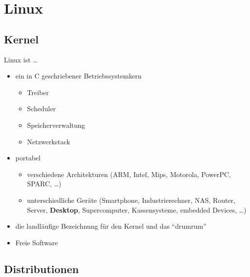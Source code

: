 \documentclass{beamer}
\makeatletter
\newcommand{\strong}[1]{\@strong{#1}}
\newcommand{\@@strong}[1]{\textbf{\let\@strong\@@@strong#1}}
\newcommand{\@@@strong}[1]{\textnormal{\let\@strong\@@strong#1}}
\let\@strong\@@strong
\makeatother
\begin{document}
\section{Linux}

\subsection{Kernel}

\begin{frame}{Linux ist …}
    \begin{itemize}
        \item ein in C geschriebener Betriebssystemkern
            \begin{itemize}
                \item Treiber
                \item Scheduler
                \item Speicherverwaltung
                \item Netzwerkstack
            \end{itemize}
        \pause
        \item portabel
            \begin{itemize}
                \item verschiedene Architekturen (ARM, Intel, Mips,
                    Motorola, PowerPC, SPARC, …)
                \item unterschiedliche Geräte (Smartphone,
                    Industrierechner, NAS, Router, Server,
                    \strong{Desktop}, Supercomputer, Kassensysteme,
                    embedded Devices, …)
            \end{itemize}
        \pause
        \item die landläufige Bezeichnung für den Kernel und das \enquote{drumrum}
        \pause
        \item Freie Software
    \end{itemize}
\end{frame}

\subsection{Distributionen}
\end{document}
